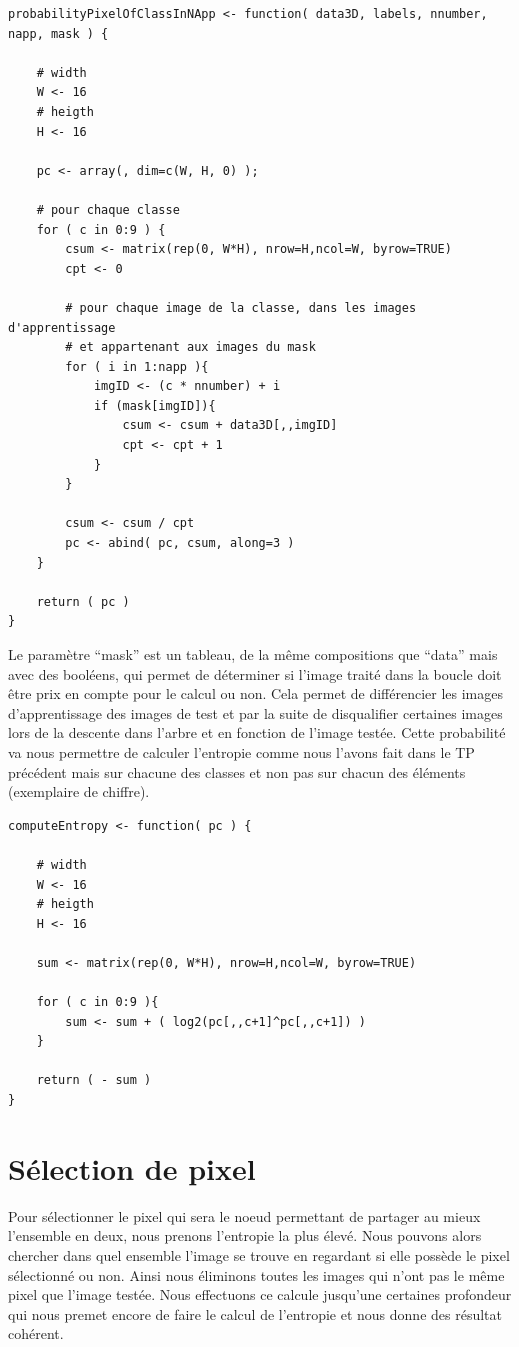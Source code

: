 \documentclass[a4paper,11pt]{article}
\begin{document}
  \begin{lstlisting}[caption=Fonction de calcul de la probabilité de la présence d'un pixel]
probabilityPixelOfClassInNApp <- function( data3D, labels, nnumber, napp, mask ) {

    # width
    W <- 16
    # heigth
    H <- 16

    pc <- array(, dim=c(W, H, 0) );

    # pour chaque classe
    for ( c in 0:9 ) {
        csum <- matrix(rep(0, W*H), nrow=H,ncol=W, byrow=TRUE)
        cpt <- 0

        # pour chaque image de la classe, dans les images d'apprentissage
        # et appartenant aux images du mask 
        for ( i in 1:napp ){
            imgID <- (c * nnumber) + i
            if (mask[imgID]){
                csum <- csum + data3D[,,imgID]
                cpt <- cpt + 1
            }
        }

        csum <- csum / cpt
        pc <- abind( pc, csum, along=3 )
    }

    return ( pc )
}
  \end{lstlisting}
  
  Le paramètre \enquote{mask} est un tableau, de la même compositions que \enquote{data} mais avec des booléens,
  qui permet de déterminer si l'image traité dans la boucle doit être 
  prix en compte pour le calcul ou non. Cela permet de différencier les images d'apprentissage des images de test 
  et par la suite de disqualifier certaines images lors de la descente dans l'arbre et en fonction de l'image testée.
  Cette probabilité va nous permettre de calculer l'entropie comme nous l'avons fait dans le TP précédent mais sur chacune
  des classes et non pas sur chacun des éléments (exemplaire de chiffre).\\
  
  \begin{lstlisting}[caption=Fonction de calcul de l'entropie]
computeEntropy <- function( pc ) {
 
    # width
    W <- 16
    # heigth
    H <- 16

    sum <- matrix(rep(0, W*H), nrow=H,ncol=W, byrow=TRUE)

    for ( c in 0:9 ){
        sum <- sum + ( log2(pc[,,c+1]^pc[,,c+1]) )
    }

    return ( - sum )
}
  \end{lstlisting}
  
  \section{Sélection de pixel}
  Pour sélectionner le pixel qui sera le noeud permettant de partager au mieux l'ensemble en deux, nous prenons
  l'entropie la plus élevé. Nous pouvons alors chercher dans quel ensemble l'image se trouve en regardant si
  elle possède le pixel sélectionné ou non. Ainsi nous éliminons toutes les images qui n'ont pas le même pixel
  que l'image testée. Nous effectuons ce calcule jusqu'une certaines profondeur qui nous premet encore de 
  faire le calcul de l'entropie et nous donne des résultat cohérent.\\
  
\end{document}
